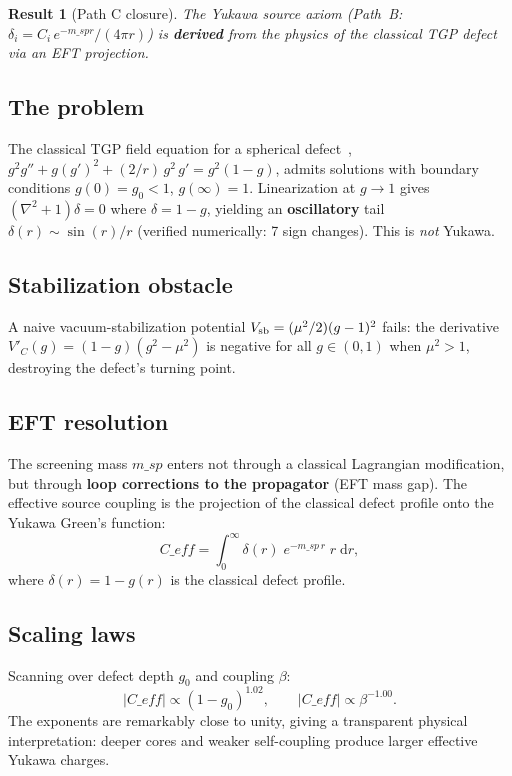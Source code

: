 \documentclass[11pt,a4paper]{article}
\def\msp{m\_sp}%
\def\Ceff{C\_eff}%
\newcommand{\msp}{m_{\rm sp}}
\newcommand{\Ceff}{C_{\rm eff}}
\newtheorem{result}{Result}
\begin{document}
\begin{result}[Path C closure]
The Yukawa source axiom (Path~B: $\delta_i = C_i\,e^{-\msp r}/(4\pi r)$)
is \textbf{derived} from the physics of the classical TGP defect via an EFT
projection.
\end{result}

\subsection{The problem}

The classical TGP field equation for a spherical
defect~\citep[cf.][for soliton physics]{Manton2004},
$g^2 g'' + g(g')^2 + (2/r)\,g^2\,g' = g^2(1-g)$, admits solutions
with boundary conditions $g(0) = g_0 < 1$, $g(\infty) = 1$.
Linearization at $g \to 1$ gives $(\nabla^2 + 1)\delta = 0$ where
$\delta = 1 - g$, yielding an \textbf{oscillatory} tail
$\delta(r) \sim \sin(r)/r$ (verified numerically: 7 sign changes).
This is \emph{not} Yukawa.

\subsection{Stabilization obstacle}

A naive vacuum-stabilization potential
$V_{\rm sb} = (\mu^2/2)(g-1)^2$ fails: the derivative
$V'_C(g) = (1-g)(g^2 - \mu^2)$ is negative for all $g \in (0,1)$
when $\mu^2 > 1$, destroying the defect's turning point.

\subsection{EFT resolution}

The screening mass $\msp$ enters not through a classical Lagrangian
modification, but through \textbf{loop corrections to the propagator}
(EFT mass gap).  The effective source coupling is the projection of the
classical defect profile onto the Yukawa Green's function:
\begin{equation}
  \boxed{
  \Ceff = \int_0^\infty \delta(r)\;e^{-\msp\,r}\;r\;\mathrm{d}r,
  }
  \label{eq:Ceff}
\end{equation}
where $\delta(r) = 1 - g(r)$ is the classical defect profile.

\subsection{Scaling laws}

Scanning over defect depth $g_0$ and coupling $\beta$:
\begin{equation}
  |\Ceff| \propto (1 - g_0)^{1.02},
  \qquad
  |\Ceff| \propto \beta^{-1.00}.
\end{equation}
The exponents are remarkably close to unity, giving a transparent physical
interpretation: deeper cores and weaker self-coupling produce larger
effective Yukawa charges.
\end{document}
